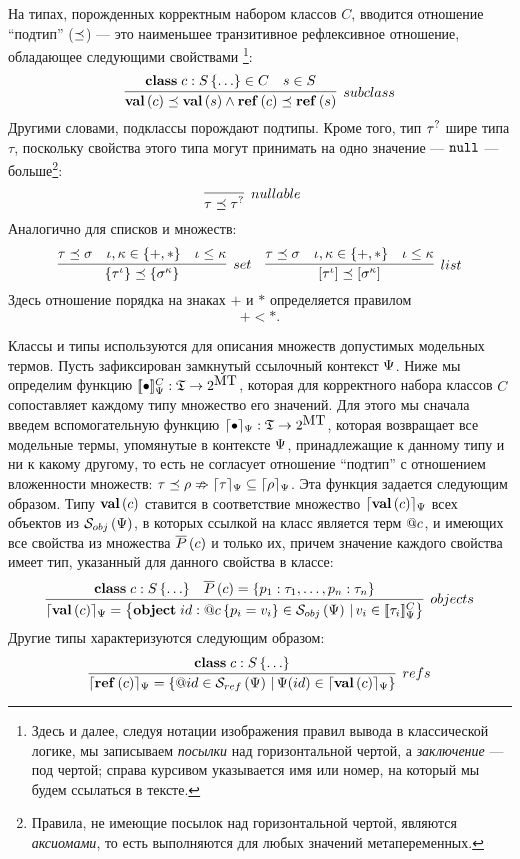На типах, порожденных корректным набором классов $C$, вводится отношение ``подтип'' ($\preceq$) --- это наименьшее транзитивное рефлексивное отношение, обладающее следующими свойствами%
\footnote{Здесь и далее, следуя нотации изображения правил вывода в классической логике, мы записываем \emph{посылки} над горизонтальной чертой, а \emph{заключение} --- под чертой; справа курсивом указывается имя или номер, на который мы будем ссылаться в тексте.}:
$$
\infer[subclass]{
\ClassT{c} \subtype \ClassT{s}
\wedge
\RefT{c} \subtype \RefT{s}
}{
	\Class{c}{S}{\ldots} \in C &
	s \in S}
$$  
Другими словами, подклассы порождают подтипы. Кроме того, тип ${\tau}^?$ шире типа $\tau$, поскольку свойства этого типа могут принимать на одно значение --- $\mathtt{null}$ --- больше\footnote{Правила, не имеющие посылок над горизонтальной чертой, являются \emph{аксиомами}, то есть выполняются для любых значений метапеременных.}:
$$
\infer[nullable]{
	\tau \subtype \NullableT{\tau}
}{}
\quad
$$
Аналогично для списков и множеств:
 $$
\infer[set]{
	\SetT{\tau^\iota} \subtype \SetT{\sigma^\kappa}
}{
	\tau \subtype \sigma &
	\iota, \kappa \in \{+, *\} &
	\iota \le \kappa
}
\quad
\infer[list]{
	\ListT{\tau^\iota} \subtype \ListT{\sigma^\kappa}
}{
	\tau \subtype \sigma &
	\iota, \kappa \in \{+, *\} &
	\iota \le \kappa
}
$$
Здесь отношение порядка на знаках $+$ и $*$ определяется правилом $$+ < *.$$

Классы и типы используются для описания множеств допустимых модельных термов.
Пусть зафиксирован замкнутый ссылочный контекст $\Psi$. 
Ниже мы определим функцию $[\![\bullet]\!]_\Psi^C : \mathfrak{T} \rightarrow 2^{\mbox{MT}}$, которая для корректного набора классов $C$ сопоставляет каждому типу множество его значений. Для этого мы сначала введем вспомогательную функцию $\lceil \bullet \rceil_\Psi : \mathfrak{T} \rightarrow 2^{\mbox{MT}}$, которая возвращает все модельные термы, упомянутые в контексте $\Psi$, принадлежащие к данному типу и ни к какому другому, то есть не согласует отношение ``подтип'' с отношением вложенности множеств: $\tau \preceq \rho \nRightarrow \lceil \tau \rceil_\Psi \subseteq \lceil \rho \rceil_\Psi$. Эта функция задается следующим образом. Типу $\mathbf{val}\left(c\right)$ ставится в соответствие множество $\lceil \mathbf{val}\left(c\right) \rceil_\Psi$ всех объектов из $\mathcal{S}_{obj}\left(\Psi\right)$, в которых ссылкой на класс является терм $@c$, и имеющих все свойства из множества $\overline{P}\left(c\right)$ и только их, причем значение каждого свойства имеет тип, указанный для данного свойства в классе:
$$
\infer[objects]{
	\semRC{\ClassT{c}} = \left\{
		\Object{id}{\Ref{c}}{p_i = v_i} \in \Objects{\RContext}
		\,|\,
		v_i \in \denotRCC{\tau_i} 
	\right\}
}{
	\Class{c}{S}{\ldots}&
	\AllProps{c} = \left\{p_1 : \tau_1, \ldots, p_n : \tau_n\right\}
}
$$ 
Другие типы характеризуются следующим образом:
$$
\infer[refs]{
	\semRC{\RefT{c}} = \left\{ \Ref{id} \in \Refs{\RContext} \,|\, \RContext(id) \in \semRC{\ClassT{c}} \right\}
}{
	\Class{c}{S}{\ldots}
}
$$

